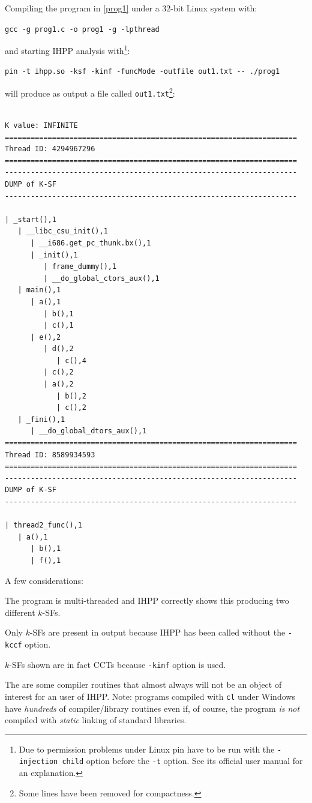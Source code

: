 \documentclass[a4paper,11pt]{report}
\begin{document}
\noindent
Compiling the program in \cref{prog1} under a 32-bit Linux system with:
\begin{center}
\verb|gcc -g prog1.c -o prog1 -g -lpthread|
\end{center}
and starting IHPP analysis with\footnote{Due to permission problems under Linux pin have to be run with the \texttt{-injection child} option before the \texttt{-t} option. See its official user manual for an explanation.}:
\begin{center}
\begin{verbatim}
pin -t ihpp.so -ksf -kinf -funcMode -outfile out1.txt -- ./prog1
\end{verbatim}
\end{center}

will produce as output a file called \verb|out1.txt|\footnote{Some lines have been removed for compactness.}:

\begin{lstlisting}[label=out1, caption=file out1.txt]

K value: INFINITE
====================================================================
Thread ID: 4294967296
====================================================================
--------------------------------------------------------------------
DUMP of K-SF
--------------------------------------------------------------------

| _start(),1
   | __libc_csu_init(),1
      | __i686.get_pc_thunk.bx(),1
      | _init(),1
         | frame_dummy(),1
         | __do_global_ctors_aux(),1
   | main(),1
      | a(),1
         | b(),1
         | c(),1
      | e(),2
         | d(),2
            | c(),4
         | c(),2
         | a(),2
            | b(),2
            | c(),2
   | _fini(),1
      | __do_global_dtors_aux(),1
====================================================================
Thread ID: 8589934593
====================================================================
--------------------------------------------------------------------
DUMP of K-SF
--------------------------------------------------------------------

| thread2_func(),1
   | a(),1
      | b(),1
      | f(),1
\end{lstlisting}


A few considerations:
\renewcommand{\labelitemi}{$-$}

\begin{itemize*}
\item The program is multi-threaded and IHPP correctly shows this 
producing two different $k$-SFs. 
\item Only $k$-SFs are present in output because IHPP has been called without the \verb|-kccf| option.
\item $k$-SFs shown are in fact CCTs because \verb|-kinf| option is used.
\item The are some compiler routines that almost always will not be an object of interest for an user of IHPP. Note: programs compiled with \verb|cl| under Windows have \emph{hundreds} of compiler\slash library routines even if, of course, the program \emph{is not} compiled with \emph{static} linking of standard libraries. 
\end{itemize*}
\end{document}
